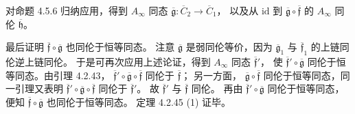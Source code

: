 对命题 4.5.6 归纳应用，得到
$A_\infty$ 同态
$\overline{\mathfrak g}\colon
\overline C_2\to\overline C_1$，
以及从 $\mathrm{id}$ 到
$\overline{\mathfrak g}
\circ\overline{\mathfrak f}$
的 $A_\infty$ 同伦
$\overline{\mathfrak h}$。

最后证明
$\overline{\mathfrak f}
\circ\overline{\mathfrak g}$
也同伦于恒等同态。
注意 $\overline{\mathfrak g}$ 是弱同伦等价，因为
$\overline{\mathfrak g}_1$
与 $\overline{\mathfrak f}_1$ 的上链同伦逆上链同伦。
于是可再次应用上述论证，得到
$A_\infty$ 同态 $\overline{\mathfrak f}'$，
使 $\overline{\mathfrak f}'
\circ\overline{\mathfrak g}$
同伦于恒等同态。由引理 4.2.43，
$\overline{\mathfrak f}'
\circ\overline{\mathfrak g}
\circ\overline{\mathfrak f}$
同伦于 $\overline{\mathfrak f}$；
另一方面，
$\overline{\mathfrak g}
\circ\overline{\mathfrak f}$
同伦于恒等同态，同一引理又表明
$\overline{\mathfrak f}'
\circ\overline{\mathfrak g}
\circ\overline{\mathfrak f}$
同伦于 $\overline{\mathfrak f}'$。
故 $\overline{\mathfrak f}'$
与 $\overline{\mathfrak f}$ 同伦。
再由
$\overline{\mathfrak f}'
\circ\overline{\mathfrak g}$
同伦于恒等同态，便知
$\overline{\mathfrak f}
\circ\overline{\mathfrak g}$
也同伦于恒等同态。
定理 4.2.45 (1) 证毕。

